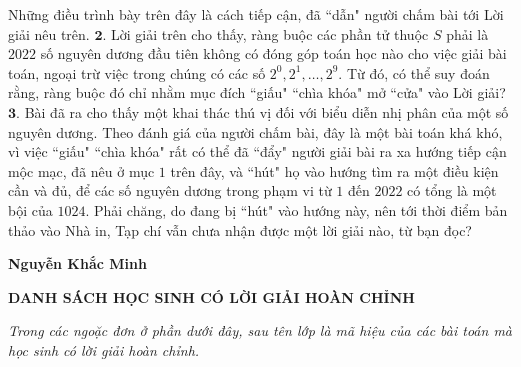 \begin{multicols}{2}
	\vskip 0.05cm
	Những điều trình bày trên đây là cách tiếp cận, đã ``dẫn" người chấm bài tới Lời giải nêu trên.
	\vskip 0.05cm
	$\pmb{2.}$ Lời giải trên cho thấy, ràng buộc các phần tử thuộc $S$ phải là $2022$ số nguyên dương đầu tiên không có đóng góp toán học nào cho việc giải bài toán, ngoại trừ việc trong chúng có các số  $2^0, 2^1, \ldots, 2^9$. Từ đó, có thể suy đoán rằng, ràng buộc đó chỉ nhằm mục đích ``giấu" ``chìa khóa" mở ``cửa" vào Lời giải?
	\vskip 0.05cm
	$\pmb{3.}$ Bài đã ra cho thấy một khai thác thú vị đối với biểu diễn nhị phân của một số nguyên dương. Theo đánh giá của người chấm bài, đây là một bài toán khá khó, vì việc ``giấu" ``chìa khóa" rất có thể đã ``đẩy" người giải bài ra xa hướng tiếp cận mộc mạc, đã nêu ở mục $1$ trên đây, và ``hút" họ vào hướng tìm ra một điều kiện cần và đủ, để các số nguyên dương trong phạm vi từ $1$ đến $2022$ có tổng là một bội của $1024$. Phải chăng, do đang bị ``hút" vào hướng này, nên tới thời điểm bản thảo vào Nhà in, Tạp chí vẫn chưa nhận được một lời giải nào, từ bạn đọc?
	\begin{flushright}
		\textbf{\color{thachthuctoanhoc}Nguyễn Khắc Minh}
	\end{flushright}
\end{multicols}
\centerline{\textbf{\color{thachthuctoanhoc}DANH SÁCH HỌC SINH CÓ LỜI GIẢI HOÀN CHỈNH}}
\vskip 0.1cm
\textit{Trong các ngoặc đơn ở phần dưới đây, sau tên lớp là mã hiệu của các bài toán mà học sinh có lời giải hoàn chỉnh.}
